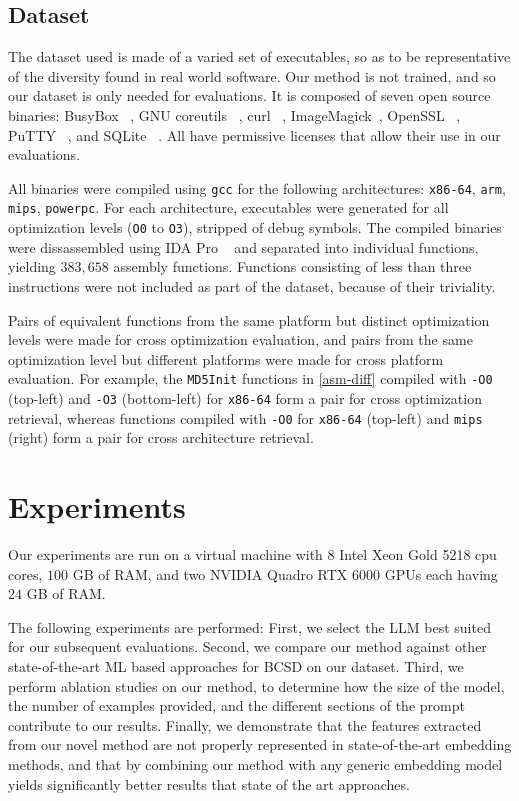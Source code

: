 \subsection{Dataset}

The dataset used is made of a varied set of executables, so as to be representative of the diversity found in real world software.
Our method is not trained, and so our dataset is only needed for evaluations. It is composed of seven open source binaries:
BusyBox ~\cite{busybox}, GNU coreutils ~\cite{coreutils}, curl ~\cite{curl}, ImageMagick~\cite{image-magick}, OpenSSL ~\cite{openssl},
PuTTY ~\cite{putty}, and SQLite ~\cite{sqlite}. All have permissive licenses that allow their use in our evaluations. 

All binaries were compiled using \texttt{gcc} for the following architectures: \texttt{x86-64}, \texttt{arm}, \texttt{mips}, \texttt{powerpc}.
For each architecture, executables were generated for all optimization levels (\texttt{O0} to \texttt{O3}), stripped of debug symbols.
The compiled binaries were dissassembled using IDA Pro ~\cite{ida} and separated into individual functions, yielding \(383,658\) assembly functions.
Functions consisting of less than three instructions were not included as part of the dataset, because of their triviality.

Pairs of equivalent functions from the same platform but distinct optimization levels were made for cross optimization
evaluation, and pairs from the same optimization level but different platforms were made for cross
platform evaluation. For example, the \texttt{MD5Init} functions in \autoref{asm-diff} compiled with \texttt{-O0} (top-left) and
\texttt{-O3} (bottom-left) for \texttt{x86-64} form a pair for cross optimization retrieval, whereas functions compiled with \texttt{-O0}
for \texttt{x86-64} (top-left) and \texttt{mips} (right) form a pair for cross architecture retrieval.

\section{Experiments}
\label{sec:exp}

Our experiments are run on a virtual machine with 8 Intel Xeon Gold 5218 cpu cores, \(100\) GB of RAM, and two NVIDIA Quadro RTX
6000 GPUs each having  \(24\) GB of RAM.

The following experiments are performed: First, we select the LLM best suited for our subsequent evaluations. Second, we compare our
method against other state-of-the-art ML based approaches for BCSD on our dataset. Third, we perform ablation studies on our method,
to determine how the size of the model, the number of examples provided, and the different sections of the prompt contribute to our results.
Finally, we demonstrate that the features extracted from our novel method are not properly represented in state-of-the-art embedding methods,
and that by combining our method with any generic embedding model yields significantly better results that state of the art approaches.


